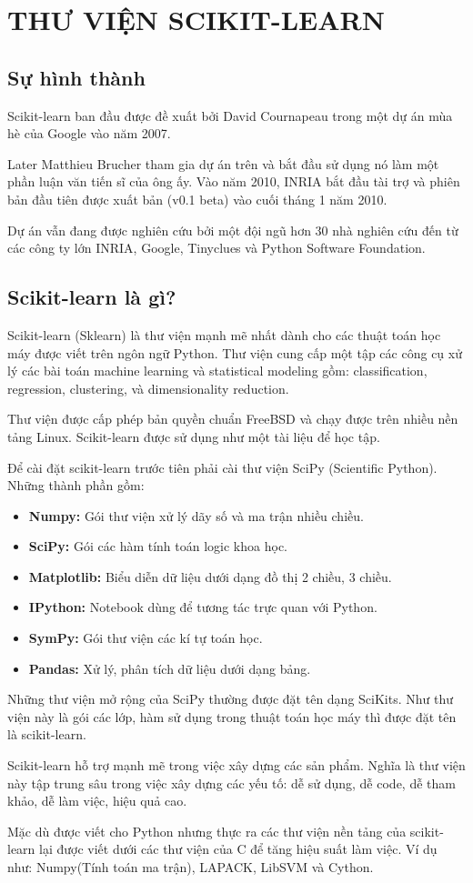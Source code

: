 \chapter{THƯ VIỆN SCIKIT-LEARN}

\section{Sự hình thành}
Scikit-learn ban đầu được đề xuất bởi David Cournapeau trong
một dự án mùa hè của Google vào năm 2007.

Later Matthieu Brucher tham gia dự án trên và bắt đầu sử dụng
nó làm một phần luận văn tiến sĩ của ông ấy.
Vào năm 2010, INRIA bắt đầu tài trợ và phiên bản đầu tiên được
xuất bản (v0.1 beta) vào cuối tháng 1 năm 2010.

Dự án vẫn đang được nghiên cứu bởi một đội ngũ hơn 30 nhà nghiên cứu
đến từ các công ty lớn INRIA, Google, Tinyclues và Python Software Foundation.

\section{Scikit-learn là gì?}
Scikit-learn (Sklearn) là thư viện mạnh mẽ nhất dành cho các thuật toán
học máy được viết trên ngôn ngữ Python. Thư viện cung cấp một tập các công cụ
xử lý các bài toán machine learning và statistical modeling gồm:
classification, regression, clustering, và dimensionality reduction.

Thư viện được cấp phép bản quyền chuẩn FreeBSD và chạy được trên
nhiều nền tảng Linux. Scikit-learn được sử dụng như một tài liệu để học tập.

Để cài đặt scikit-learn trước tiên phải cài thư viện SciPy (Scientific Python).
Những thành phần gồm:

\begin{itemize}
    \item \textbf{Numpy:} Gói thư viện xử lý dãy số và ma trận nhiều chiều.
    \item \textbf{SciPy:} Gói các hàm tính toán logic khoa học.
    \item \textbf{Matplotlib:} Biểu diễn dữ liệu dưới dạng đồ thị 2 chiều, 3 chiều.
    \item \textbf{IPython:} Notebook dùng để tương tác trực quan với Python.
    \item \textbf{SymPy:} Gói thư viện các kí tự toán học.
    \item \textbf{Pandas:} Xử lý, phân tích dữ liệu dưới dạng bảng.
\end{itemize}

Những thư viện mở rộng của SciPy thường được đặt tên dạng SciKits.
Như thư viện này là gói các lớp, hàm sử dụng trong thuật toán học máy
thì được đặt tên là scikit-learn.

Scikit-learn hỗ trợ mạnh mẽ trong việc xây dựng các sản phẩm.
Nghĩa là thư viện này tập trung sâu trong việc xây dựng các yếu tố:
dễ sử dụng, dễ code, dễ tham khảo, dễ làm việc, hiệu quả cao.

Mặc dù được viết cho Python nhưng thực ra các thư viện nền tảng
của scikit-learn lại được viết dưới các thư viện của C để tăng
hiệu suất làm việc.
Ví dụ như: Numpy(Tính toán ma trận), LAPACK, LibSVM và Cython.
